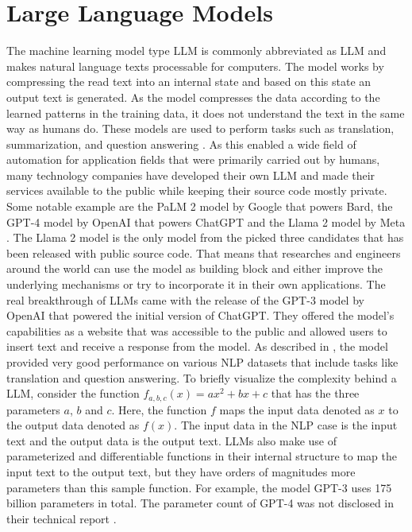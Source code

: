 \documentclass[draft,final]{thesisclass} %
\begin{document}
\section{Large Language Models}
The machine learning model type \gls{LLM} is commonly abbreviated as \acs{LLM} and makes natural language texts processable for computers.
The model works by compressing the read text into an internal state and based on this state an output text is generated.
As the model compresses the data according to the learned patterns in the training data, it does not understand the text in the same way as humans do.
These models are used to perform tasks such as translation, summarization, and question answering \parencite[1]{llm_literature_review}.
As this enabled a wide field of automation for application fields that were primarily carried out by humans, many technology companies have developed their own \acs{LLM} and made their services available to the public while keeping their source code mostly private.
Some notable example are the PaLM 2 model by Google \parencite{palm2} that powers Bard, the GPT-4 model by OpenAI \parencite{gpt4} that powers ChatGPT and the Llama 2 model by Meta \parencite{llama2}.
The Llama 2 model is the only model from the picked three candidates that has been released with public source code.
That means that researches and engineers around the world can use the model as building block and either improve the underlying mechanisms or try to incorporate it in their own applications.
The real breakthrough of \acs{LLM}s came with the release of the GPT-3 model by OpenAI \parencite{gpt3} that powered the initial version of ChatGPT.
They offered the model's capabilities as a website that was accessible to the public and allowed users to insert text and receive a response from the model.
As described in \textcite[1]{gpt3}, the model provided very good performance on various \acs{NLP} datasets that include tasks like translation and question answering.
To briefly visualize the complexity behind a \acs{LLM}, consider the function $f_{a,b,c}(x) = ax^2+bx+c$ that has the three parameters $a$, $b$ and $c$.
Here, the function $f$ maps the input data denoted as $x$ to the output data denoted as $f(x)$.
The input data in the \acs{NLP} case is the input text and the output data is the output text.
\acs{LLM}s also make use of parameterized and differentiable functions in their internal structure to map the input text to the output text, but they have orders of magnitudes more parameters than this sample function.
For example, the model GPT-3 uses 175 billion parameters \parencite[1]{gpt3} in total. The parameter count of GPT-4 was not disclosed in their technical report \parencite{gpt4}.
\end{document}
